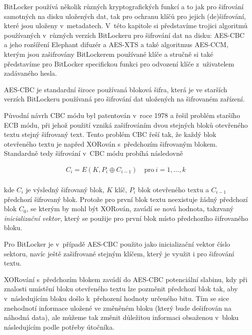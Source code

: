\label{sec:algorithms}

BitLocker používá několik různých kryptografických funkcí a to jak pro šifrování samotných na disku uložených dat, tak pro ochranu klíčů pro jejich (de)šifrování, které jsou uloženy v~metadatech. V~této kapitole si představíme trojici algoritmů používaných v~různých verzích BitLockeru pro šifrování dat na disku: AES-CBC a jeho rozšíření Elephant difuzér a AES-XTS a také algoritmus AES-CCM, kterým jsou zašifrovány BitLockerem používané klíče a stručně si také představíme pro BitLocker specifickou funkci pro odvození klíče z~uživatelem zadávaného hesla.

\label{sec:aes-cbc}

AES-CBC je standardní široce používaná bloková šifra, která je ve starších verzích BitLockeru používaná pro šifrování dat uložených na šifrovaném zařízení.

Původní návrh CBC módu byl patentován v~roce 1978\cite{Ehrsam1978} a řešil problém staršího ECB módu, při jehož použití vzniká zašifrováním dvou stejných bloků otevřeného textu stejný šifrovaný text. Tento problém CBC řeší tak, že každý blok otevřeného textu je napřed XORován s~předchozím šifrovaným blokem. Standardně tedy šifrování v~CBC módu probíhá následovně

\begin{align}
C_i = E(K, P_i \oplus C_{i-1}) \quad \text{pro}\ i = 1, \dots, k~\\ \nonumber
\end{align}

kde $C_i$ je výsledný šifrovaný blok, $K$ klíč, $P_i$ blok otevřeného textu a $C_{i-1}$ předchozí šifrovaný blok. Protože pro první blok textu neexistuje žádný předchozí blok $C_0$, se kterým by mohl být XORován, zavádí se nová hodnota, takzvaný \emph{inicializační vektor}, který se použije pro první blok místo předchozího šifrovaného bloku.\cite{Kohnoc2010}


Pro BitLocker je v~případě AES-CBC použito jako inicializační vektor číslo sektoru, navíc ještě zašifrované stejným klíčem, který je využit i pro šifrování textu.

XORování s~předchozím blokem zavádí do AES-CBC potenciální slabinu, kdy při znalosti umístění bloku otevřeného textu lze pozměnit předchozí blok tak, aby v~následujícím bloku došlo k~přehození hodnoty určeného bitu. Tím se sice znehodnotí informace uložené ve změněném bloku (který bude dešifrován na náhodná data), ale můžeme tak změnit důležitou informaci obsaženou v~bloku následujícím podle potřeby útočníka.\cite{Regalado2013}

